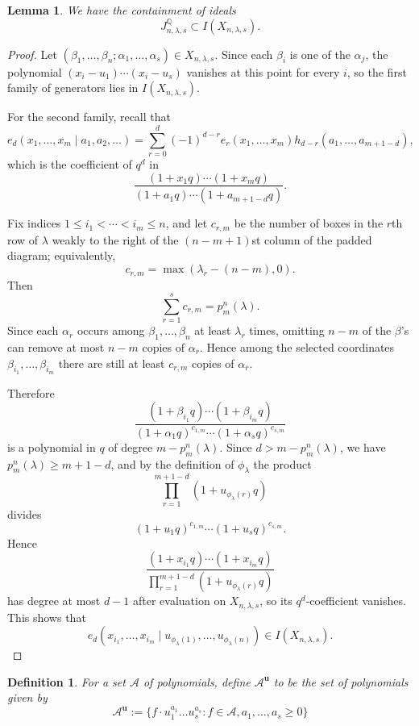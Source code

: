 \documentclass[11pt]{amsart}
\numberwithin{equation}{section}
\newtheorem{lemma}[theorem]{Lemma}
\newtheorem{definition}[theorem]{Definition}
\theoremstyle{definition}
\newcommand{\AAA}{{\mathcal{A}}}
\newcommand{\QQ}{{\mathbb{Q}}}
\newcommand{\uuu}{{\mathbf{u}}}
\begin{document}
\begin{lemma}\label{lem: ideal-containment}
    We have the containment of ideals
    \[
    J^\QQ_{n,\lambda,s}\subset I(X_{n,\lambda,s}).
    \]
\end{lemma}

\begin{proof}
    Let $(\beta_1,\dots,\beta_n;\alpha_1,\dots,\alpha_s)\in X_{n,\lambda,s}$.
    Since each $\beta_i$ is one of the $\alpha_j$, the polynomial
    $(x_i-u_1)\cdots(x_i-u_s)$ vanishes at this point for every $i$, so the
    first family of generators lies in $I(X_{n,\lambda,s})$.

    For the second family, recall that
    \[
    e_d(x_1,\dots,x_m\mid a_1,a_2,\dots)
    =\sum_{r=0}^d (-1)^{d-r} e_r(x_1,\dots,x_m)h_{d-r}(a_1,\dots,a_{m+1-d}),
    \]
    which is the coefficient of $q^d$ in
    \[
    \frac{(1+x_1q)\cdots(1+x_mq)}{(1+a_1q)\cdots(1+a_{m+1-d}q)}.
    \]

    Fix indices $1\leq i_1<\cdots<i_m\leq n$, and let $c_{r,m}$ be the number of
    boxes in the $r$th row of $\lambda$ weakly to the right of the
    $(n-m+1)$st column of the padded diagram; equivalently,
    \[
    c_{r,m}=\max(\lambda_r-(n-m),0).
    \]
    Then
    \[
    \sum_{r=1}^s c_{r,m}=p_m^n(\lambda).
    \]
    Since each $\alpha_r$ occurs among $\beta_1,\dots,\beta_n$ at least
    $\lambda_r$ times, omitting $n-m$ of the $\beta$'s can remove at most $n-m$
    copies of $\alpha_r$. Hence among the selected coordinates
    $\beta_{i_1},\dots,\beta_{i_m}$ there are still at least $c_{r,m}$ copies of
    $\alpha_r$.

    Therefore
    \[
    \frac{(1+\beta_{i_1}q)\cdots(1+\beta_{i_m}q)}
    {(1+\alpha_1 q)^{c_{1,m}}\cdots (1+\alpha_s q)^{c_{s,m}}}
    \]
    is a polynomial in $q$ of degree $m-p_m^n(\lambda)$. Since
    $d>m-p_m^n(\lambda)$, we have $p_m^n(\lambda)\geq m+1-d$, and by the
    definition of $\phi_\lambda$ the product
    \[
    \prod_{r=1}^{m+1-d} (1+u_{\phi_\lambda(r)}q)
    \]
    divides
    \[
    (1+u_1q)^{c_{1,m}}\cdots (1+u_sq)^{c_{s,m}}.
    \]
    Hence
    \[
    \frac{(1+x_{i_1}q)\cdots(1+x_{i_m}q)}
    {\prod_{r=1}^{m+1-d}(1+u_{\phi_\lambda(r)}q)}
    \]
    has degree at most $d-1$ after evaluation on $X_{n,\lambda,s}$, so its
    $q^d$-coefficient vanishes. This shows that
    \[
    e_d(x_{i_1},\dots,x_{i_m}\mid u_{\phi_\lambda(1)},\dots,u_{\phi_\lambda(n)})
    \in I(X_{n,\lambda,s}).
    \]
\end{proof}

\begin{definition}
    For a set $\AAA$ of polynomials, define $\AAA^\uuu$ to be the set of polynomials given by
    \[
\AAA^\uuu := \{ f \cdot u_1^{a_1}\dots u_s^{a_s} : f \in \AAA, a_1,\dots,a_s \geq 0\}
\]
\end{definition} 
\end{document}
